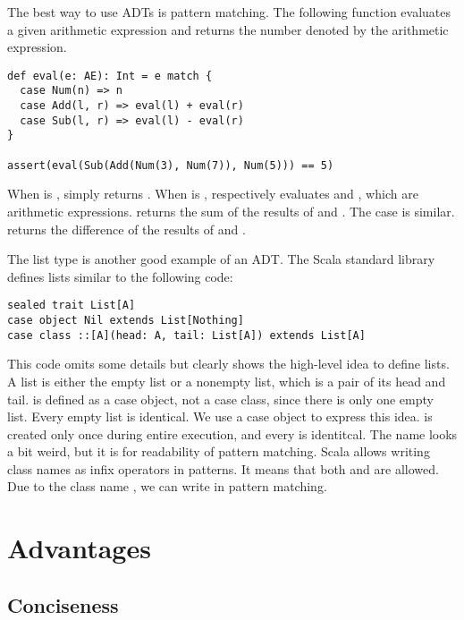 The best way to use ADTs is pattern matching. The following function evaluates a
given arithmetic expression and returns the number denoted by the arithmetic
expression.

\begin{verbatim}
def eval(e: AE): Int = e match {
  case Num(n) => n
  case Add(l, r) => eval(l) + eval(r)
  case Sub(l, r) => eval(l) - eval(r)
}

assert(eval(Sub(Add(Num(3), Num(7)), Num(5))) == 5)
\end{verbatim}

When  is ,  simply returns .
When  is ,  respectively evaluates 
and , which are arithmetic expressions.  returns the sum of
the results of  and .
The  case is similar.  returns the difference of
the results of  and .

The list type is another good example of an ADT. The Scala standard library defines
lists similar to the following code:

\begin{verbatim}
sealed trait List[A]
case object Nil extends List[Nothing]
case class ::[A](head: A, tail: List[A]) extends List[A]
\end{verbatim}

This code omits some details but clearly shows the high-level idea to define
lists.
A list is either the empty
list or a nonempty list, which is a pair of its head and tail.  is
defined as a case object, not a case class, since there is only one empty list.
Every empty list is identical. We use a case object to express this idea.
 is created only once during entire execution, and every  is
identitcal. The name \code{::} looks a bit weird, but it is for
readability of pattern matching. Scala allows writing class names as infix
operators in patterns. It means that both  and  are allowed. Due to the class name \code{::}, we can write  in pattern matching.

\section{Advantages}

\subsection{Conciseness}

